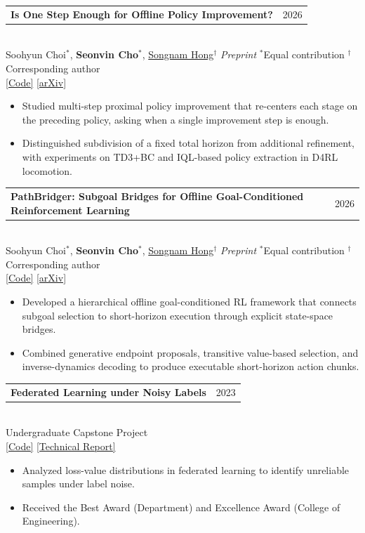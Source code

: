 \documentclass[10pt,a4paper]{article}
\makeatletter
\newcommand{\researchentry}[4]{%
  \begin{tabularx}{\textwidth}{@{}X >{\raggedleft\arraybackslash}p{0.10\textwidth}@{}}
    \textbf{#1} & \textcolor{cvgray}{#2}
  \end{tabularx}\\[-1pt]
  {\small #3}\vspace{1pt}
  \begin{itemize}[leftmargin=1.25em,itemsep=1pt,topsep=1pt,parsep=0pt]
    #4
  \end{itemize}
  \vspace{0pt}
}
\makeatother
\begin{document}
\researchentry
  {Is One Step Enough for Offline Policy Improvement?}
  {2026}
  {Soohyun Choi$^{*}$, \textbf{Seonvin Cho$^{*}$}, \href{https://sites.google.com/view/snlab}{Songnam Hong}$^{\dagger}$ \;\textperiodcentered\; \textit{Preprint} \;\textperiodcentered\; $^{*}$Equal contribution \;\textperiodcentered\; $^{\dagger}$Corresponding author\\
   \href{https://github.com/SChoish/MPI}{[Code]} \;\; \href{https://arxiv.org/pdf/2609.03842}{[arXiv]}}
  {
    \item Studied multi-step proximal policy improvement that re-centers each stage on the preceding policy, asking when a single improvement step is enough.
    \item Distinguished subdivision of a fixed total horizon from additional refinement, with experiments on TD3+BC and IQL-based policy extraction in D4RL locomotion.
  }

\researchentry
  {PathBridger: Subgoal Bridges for Offline Goal-Conditioned Reinforcement Learning}
  {2026}
  {Soohyun Choi$^{*}$, \textbf{Seonvin Cho$^{*}$}, \href{https://sites.google.com/view/snlab}{Songnam Hong}$^{\dagger}$ \;\textperiodcentered\; \textit{Preprint} \;\textperiodcentered\; $^{*}$Equal contribution \;\textperiodcentered\; $^{\dagger}$Corresponding author\\
   \href{https://github.com/SChoish/PathBridger}{[Code]} \;\; \href{https://arxiv.org/pdf/2608.29061}{[arXiv]}}
  {
    \item Developed a hierarchical offline goal-conditioned RL framework that connects subgoal selection to short-horizon execution through explicit state-space bridges.
    \item Combined generative endpoint proposals, transitive value-based selection, and inverse-dynamics decoding to produce executable short-horizon action chunks.
  }

\researchentry
  {Federated Learning under Noisy Labels}
  {2023}
  {Undergraduate Capstone Project\\
   \href{https://github.com/seonvin0319/TriMix}{[Code]} \;\; \href{https://seonvin0319.github.io/assets/Analyzing_Loss_Value_Distribution_from_Learning_Label_Noise_Data_in_the_Federated_Learning_Environment.pdf}{[Technical Report]}}
  {
    \item Analyzed loss-value distributions in federated learning to identify unreliable samples under label noise.
    \item Received the Best Award (Department) and Excellence Award (College of Engineering).
  }
\end{document}
